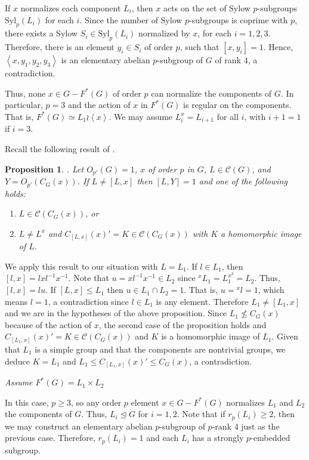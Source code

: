 \documentclass[11pt,twoside]{amsart}
\theoremstyle{plain}
\newtheorem{proposition}[theorem]{Proposition}
\theoremstyle{definition}
\theoremstyle{remark}
\def\C{{\mathcal C}}
\def\Syl{{\text{Syl}}}
\newcommand{\normal}{\trianglelefteq}
\newcommand\gen[1]{\left\langle#1\right\rangle}
\begin{document}
If $x$ normalizes each component $L_i$, then $x$ acts on the set of Sylow $p$-subgroups $\Syl_p(L_i)$ for each $i$. Since the number of Sylow $p$-subgroups is coprime with $p$, there exists a Sylow $S_i\in\Syl_p(L_i)$ normalized by $x$, for each $i = 1,2,3$. Therefore, there is an element $y_i\in S_i$ of order $p$, such that $[x,y_i] = 1$. Hence, $\gen{x,y_1,y_2,y_3}$ is an elementary abelian $p$-subgroup of $G$ of rank $4$, a contradiction.

Thus, none $x \in G - F^*(G)$ of order $p$ can normalize the components of $G$. In particular, $p = 3$ and the action of $x$ in $F^*(G)$ is regular on the components. That is, $F^*(G) \simeq L_1 \wr \gen{x}$. We may assume $L_i ^x = L_{i+1}$ for all $i$, with $i + 1  =1$ if $i = 3$.

Recall the following result of \cite{Asc86}.

\begin{proposition}\cite[31.18.1]{Asc86}.
Let $O_{p'}(G) = 1$, $x$ of order $p$ in $G$, $L\in \C(G)$, and $Y = O_{p'}(C_G(x))$. If $L \neq [L,x]$ then $[L,Y] = 1$ and one of the following holds:
\begin{enumerate}
\item $L\in \C(C_G(x))$, or
\item $L\neq L^x$ and $C_{[L,x]}(x)' = K\in \C(C_G(x))$ with $K$ a homomorphic image of $L$.
\end{enumerate}
\end{proposition}

We apply this result to our situation with $L= L_1$. If $l\in L_1$, then $[l,x] = lxl^{-1}x^{-1}$. Note that $u = xl^{-1} x^{-1}\in L_ 2$ since ${}^{x}L_1 = L_1^{x^2} = L_2$. Thus, $[l,x] = l u $. If $[L,x]\leq L_1$ then $u\in L_1\cap L_2  = 1$.  That is, $u = {}^xl = 1$, which means $l = 1$, a contradiction since $l\in L_1$ is any element. Therefore $L_1\neq [L_1,x]$ and we are in the hypotheses of the above proposition. Since $L_1\not\leq C_G(x)$ because of the action of $x$, the second case of the proposition holds and $C_{[L_1,x]}(x) ' = K\in \C(C_G(x))$ and $K$ is a homomorphic image of $L_1$. Given that $L_1$ is a simple group and that the components are nontrivial groups, we deduce $K =L_1$ and $L_1\leq C_{[L_1,x]}(x) ' \leq C_G(x)$, a contradiction. 

\vspace{0.3cm}


\textit{Assume $F^*(G) = L_1\times L_2$}

In this case, $p\geq 3$, so any order $p$ element $x\in G - F^*(G)$ normalizes $L_1$ and $L_2$ the components of $G$. Thus, $L_i\normal G$ for $i = 1,2$.  Note that if $r_p(L_i) \geq 2$, then we may construct an elementary abelian $p$-subgroup of $p$-rank $4$ just as the previous case. Therefore, $r_p(L_i) = 1$ and each $L_i$ has a strongly $p$-embedded subgroup.
\end{document}
